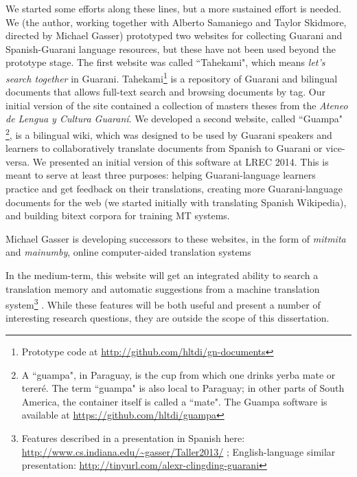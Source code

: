 We started some efforts along these lines, but a more sustained effort is
needed. We (the author, working together with Alberto Samaniego and Taylor
Skidmore, directed by Michael Gasser) prototyped two websites for collecting
Guarani and Spanish-Guarani language resources, but these have not been used
beyond the prototype stage.
The first website was called ``Tahekami", which means \emph{let's search
together} in Guarani. Tahekami\footnote{Prototype code at
\url{http://github.com/hltdi/gn-documents}} is a repository of Guarani and
bilingual documents that allows full-text search and browsing documents by tag.
Our initial version of the site contained a collection of masters theses from
the \emph{Ateneo de Lengua y Cultura Guaraní}.
We developed a second website, called ``Guampa" \footnote{A ``guampa", in
Paraguay, is the cup from which one drinks yerba mate or tereré. The term
``guampa" is also local to Paraguay; in other parts of South America, the
container itself is called a ``mate". The Guampa software is available at
\url{https://github.com/hltdi/guampa}}, is a bilingual wiki, which was designed
to be used by Guarani speakers and learners to collaboratively translate
documents from Spanish to Guarani or vice-versa. We presented an initial version
of this software at LREC 2014\cite{RUDNICK14.151}. This is meant to serve at
least three purposes: helping Guarani-language learners practice and get
feedback on their translations, creating more Guarani-language documents for the
web (we started initially with translating Spanish Wikipedia), and building
bitext corpora for training MT systems.

Michael Gasser is developing successors to these websites, in the form of
\emph{mitmita} and \emph{mainumby}, online computer-aided translation systems

In the medium-term, this website will get an integrated ability to search
a translation memory and automatic suggestions from a machine translation
system\footnote{Features described in a presentation in Spanish here:
\url{http://www.cs.indiana.edu/~gasser/Taller2013/} ; English-language similar
presentation: \url{http://tinyurl.com/alexr-clingding-guarani} }
. While these features will be both useful and present a number of
interesting research questions, they are outside the scope of this
dissertation.
